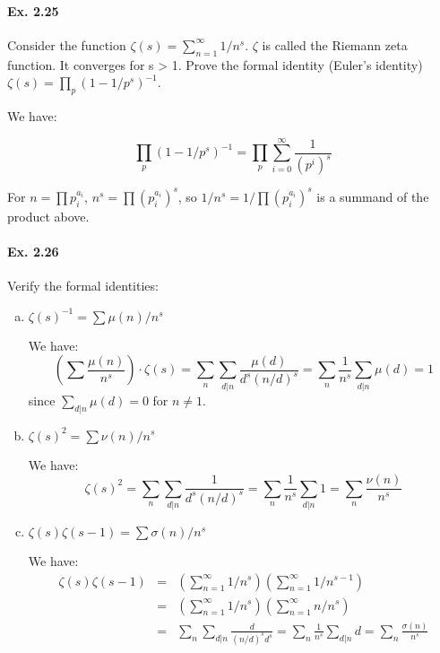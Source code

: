 \documentclass[notitlepage]{article}
\theoremstyle{definition}
\begin{document}
\paragraph{Ex. 2.25}
Consider the function $\zeta(s) = \sum_{n=1}^\infty 1/n^s$. $\zeta$
is called the Riemann zeta function. It converges for s > 1. Prove the
formal identity (Euler's identity) $\zeta(s) = \prod_p (1-1/p^s)^{-1}$.

We have:

\begin{equation}
  \prod_p (1-1/p^s)^{-1} = \prod_p \sum_{i=0}^\infty \frac{1}{(p^i)^s}
\end{equation}

For $n = \prod p_i^{a_i}$, $n^s = \prod (p_i^{a_i})^s$, so $1/n^s =
1/\prod (p_i^{a_i})^s$ is a summand of the product above.

\paragraph{Ex. 2.26}
Verify the formal identities:
\begin{enumerate}[a)]
\item $\zeta(s)^{-1} = \sum \mu(n)/n^s$
  
We have:
\begin{equation}
  \left(\sum \frac{\mu(n)}{n^s}\right) \cdot \zeta(s)  = \sum_n \sum_{d|n} \frac{\mu(d)}{d^s(n/d)^s} = \sum_n \frac{1}{n^s}\sum_{d|n} \mu(d) = 1
\end{equation}
since $\sum_{d|n} \mu(d) = 0$ for $n \ne 1$.

\item $\zeta(s)^{2} = \sum \nu(n)/n^s$

We have:
\begin{equation}
  \zeta(s)^2 = \sum_n \sum_{d|n} \frac{1}{d^s(n/d)^s} = \sum_n
  \frac{1}{n^s}\sum_{d|n} 1 =\sum_n \frac{\nu(n)}{n^s}
\end{equation}

\item $\zeta(s)\zeta(s-1) = \sum \sigma(n)/n^s$
  
  We have:
\begin{eqnarray}
  \zeta(s)\zeta(s-1) &=& \left(\sum_{n=1}^\infty 1/n^s\right)
  \left(\sum_{n=1}^\infty 1/n^{s-1}\right) \\ &=&
  \left(\sum_{n=1}^\infty 1/n^s\right)\left(\sum_{n=1}^\infty
  n/n^s\right) \\
  &=& \sum_n \sum_{d|n} \frac{d}{(n/d)^sd^s} = \sum_n
  \frac{1}{n^s} \sum_{d|n} d = \sum_n \frac{\sigma(n)}{n^s}
\end{eqnarray}
\end{enumerate}
\end{document}
